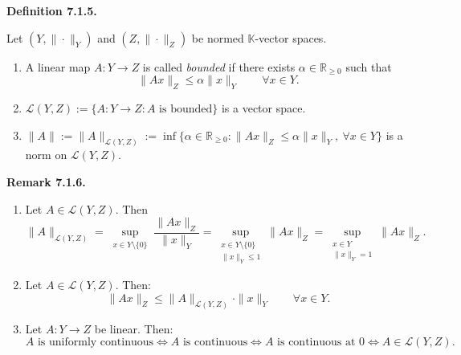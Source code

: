 \documentclass[12pt]{article}
\newenvironment{definition}[1]{%
  \par\vspace{6pt}\noindent\textbf{Definition #1.}\itshape\space
}{%
  \par\vspace{6pt}
}
\newenvironment{bemerkung}[1]{%
  \par\vspace{6pt}\noindent\textbf{Remark #1.}\itshape\space
}{%
  \par\vspace{6pt}
}
\begin{document}
\begin{definition}{7.1.5}
Let $(Y,\|\cdot\|_Y)$ and $(Z,\|\cdot\|_Z)$ be normed $\mathbb K$-vector spaces.
\begin{enumerate}
    \item A linear map $A:Y\to Z$ is called \emph{bounded} if there exists $\alpha\in\mathbb R_{\ge 0}$
    such that
    \[
    \|Ax\|_Z\le\alpha\|x\|_Y
    \qquad\forall x\in Y.
    \]

    \item $\mathcal L(Y,Z):=\{A:Y\to Z: A\text{ is bounded}\}$ is a vector space.

    \item $\|A\|:=\|A\|_{\mathcal L(Y,Z)}:=\inf\{\alpha\in\mathbb R_{\ge 0}:\|Ax\|_Z\le\alpha\|x\|_Y,\ \forall x\in Y\}$
    is a norm on $\mathcal L(Y,Z)$.
\end{enumerate}
\end{definition}

\begin{bemerkung}{7.1.6}
\begin{enumerate}
    \item Let $A\in\mathcal L(Y,Z)$. Then
    \[
    \|A\|_{\mathcal L(Y,Z)}
    =\sup_{\substack{x\in Y\setminus\{0\}}}\frac{\|Ax\|_Z}{\|x\|_Y}
    =\sup_{\substack{x\in Y\setminus\{0\}\\\|x\|_Y\le 1}}\|Ax\|_Z
    =\sup_{\substack{x\in Y\\\|x\|_Y=1}}\|Ax\|_Z.
    \]

    \item Let $A\in\mathcal L(Y,Z)$. Then:
    \[
    \|Ax\|_Z\le\|A\|_{\mathcal L(Y,Z)}\cdot\|x\|_Y
    \qquad\forall x\in Y.
    \]

    \item Let $A:Y\to Z$ be linear. Then:
    \[
    A\text{ is uniformly continuous}
    \iff A\text{ is continuous}
    \iff A\text{ is continuous at }0
    \iff A\in\mathcal L(Y,Z).
    \]
\end{enumerate}
\end{bemerkung}
\end{document}
